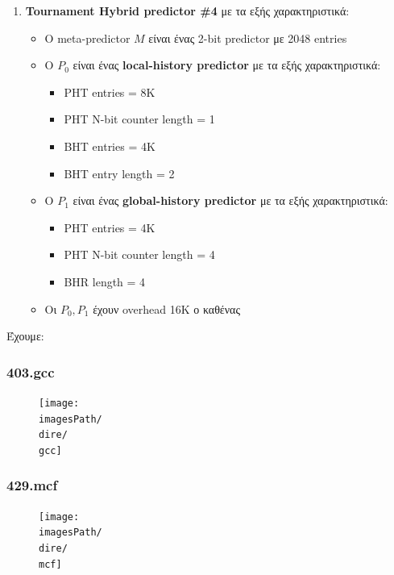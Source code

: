 \documentclass[12pt,a4paper]{article}
\newcommand{\imagesPath}{/home/nick/arch-ntua/ex02/graphs}
\newcommand{\gcc}{403.gcc.cslab_branch_predictors.out.pdf}
\newcommand{\mcf}{429.mcf.cslab_branch_predictors.out.pdf}
\newcommand{\dire}{4.5}
\begin{document}
\begin{enumerate}
				\item \textbf{Tournament Hybrid predictor \#4} με τα εξής χαρακτηριστικά:
					\begin{itemize}
						\item Ο meta-predictor $M$ είναι ένας 2-bit predictor με 2048 entries
						\item Ο $P_0$ είναι ένας \textbf{local-history predictor} με τα εξής χαρακτηριστικά:
							\begin{itemize}
								\item PHT entries = 8K
								\item PHT N-bit counter length = 1
								\item BHT entries = 4K
								\item BHT entry length = 2
							\end{itemize}
						\item Ο $P_1$ είναι ένας \textbf{global-history predictor} με τα εξής χαρακτηριστικά:
							\begin{itemize}
								\item PHT entries = 4K
								\item PHT N-bit counter length = 4
								\item BHR length = 4
							\end{itemize}
						\item Οι $P_0, P_1$ έχουν overhead 16K ο καθένας
					\end{itemize}
			\end{enumerate}	
		
		Έχουμε:
		
		\subsubsection{403.gcc}
			\begin{figure}[H]
				\begin{center}
					 \texttt{[image: \\imagesPath/\\dire/\\gcc]}
				\end{center}
			\end{figure}
		
		\subsubsection{429.mcf}
			\begin{figure}[H]
				\begin{center}
					 \texttt{[image: \\imagesPath/\\dire/\\mcf]}
				\end{center}
			\end{figure}
		
\end{document}
